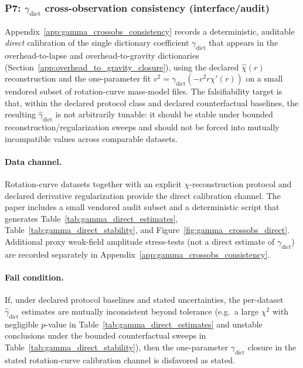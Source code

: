 \subsubsection{P7: \texorpdfstring{$\gamma_{\mathrm{dict}}$}{gamma\_dict} cross-observation consistency (interface/audit)}
\label{subsec:p7_gamma_crossobs}

Appendix~\ref{app:gamma_crossobs_consistency} records a deterministic, auditable \emph{direct} calibration of the single dictionary coefficient
$\gamma_{\mathrm{dict}}$ that appears in the overhead-to-lapse and overhead-to-gravity dictionaries (Section~\ref{app:overhead_to_gravity_closure}),
using the declared $\widehat\chi(r)$ reconstruction and the one-parameter fit $v^2=\gamma_{\mathrm{dict}}(-c^2 r\chi'(r))$ on a small vendored subset of rotation-curve mass-model files.
The falsifiability target is that, within the declared protocol class and declared counterfactual baselines, the resulting $\widehat\gamma_{\mathrm{dict}}$ is not arbitrarily tunable:
it should be stable under bounded reconstruction/regularization sweeps and should not be forced into mutually incompatible values across comparable datasets.

\paragraph{Data channel.}
Rotation-curve datasets together with an explicit $\chi$-reconstruction protocol and declared derivative regularization provide the direct calibration channel.
The paper includes a small vendored audit subset and a deterministic script that generates
Table~\ref{tab:gamma_direct_estimates}, Table~\ref{tab:gamma_direct_stability}, and Figure~\ref{fig:gamma_crossobs_direct}.
\AuditTag Additional proxy weak-field amplitude stress-tests (not a direct estimate of $\gamma_{\mathrm{dict}}$) are recorded separately in Appendix~\ref{app:gamma_crossobs_consistency}.

\paragraph{Fail condition.}
If, under declared protocol baselines and stated uncertainties, the per-dataset $\widehat\gamma_{\mathrm{dict}}$ estimates are mutually inconsistent beyond tolerance
(e.g.\ a large $\chi^2$ with negligible $p$-value in Table~\ref{tab:gamma_direct_estimates} and unstable conclusions under the bounded counterfactual sweeps in Table~\ref{tab:gamma_direct_stability}),
then the one-parameter $\gamma_{\mathrm{dict}}$ closure in the stated rotation-curve calibration channel is disfavored as stated.


